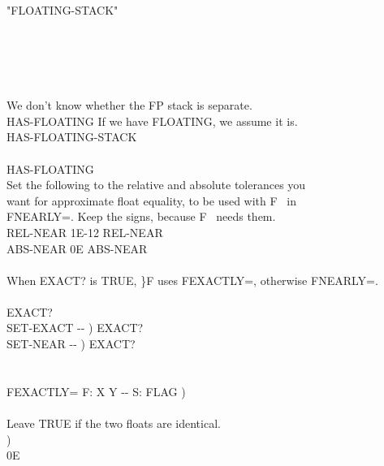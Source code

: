 \begin{tt}
\\
"FLOATING-STACK"  \word[tools]{[IF]} \\
\tab \word[tools]{[IF]} \\
\tab[2]  \\
\tab \word[tools]{[ELSE]} \\
\tab[2]  \\
\tab \word[tools]{[THEN]} \\
\word[tools]{[ELSE]}             We don't know whether the FP stack is separate. \\
\tab HAS-FLOATING    If we have FLOATING, we assume it is. \\
\word[tools]{[THEN]}  HAS-FLOATING-STACK \\
\\
HAS-FLOATING \word[tools]{[IF]} \\
\tab {} Set the following to the relative and absolute tolerances you \\
\tab {} want for approximate float equality, to be used with F~ in \\
\tab {} FNEARLY=.  Keep the signs, because F~ needs them. \\
\tab {} REL-NEAR  1E-12  REL-NEAR  \\
\tab {} ABS-NEAR     0E  ABS-NEAR  \\
\\
\tab {} When EXACT? is TRUE, \}F uses FEXACTLY=, otherwise FNEARLY=. \\
\\
\tab {}  EXACT? \\
\tab \word{:} SET-EXACT   -{}- )     EXACT? \word{;} \\
\tab \word{:} SET-NEAR    -{}- )    EXACT? \word{;} \\
\\
\tab {} \\
\tab \word{:} FEXACTLY=   F: X Y -{}- S: FLAG ) \\
\tab[2]  \\
\tab[2] Leave TRUE if the two floats are identical. \\
\tab[2] ) \\
\tab[2] 0E  \word{;} \\
\tab {} \\

\end{tt}
